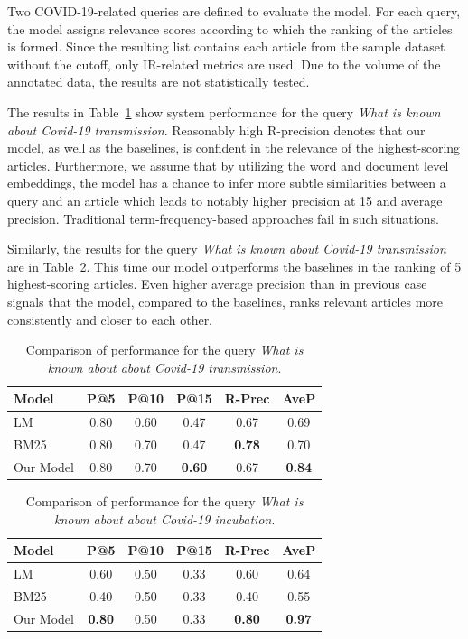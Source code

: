 \documentclass[10pt, a4paper]{article}
\begin{document}
	Two COVID-19-related queries are defined to evaluate the model. For each query, the model assigns relevance scores according to which the ranking of the articles is formed. Since the resulting list contains each article from the sample dataset without the cutoff, only IR-related metrics are used. Due to the volume of the annotated data, the results are not statistically tested. 
	
	The results in Table~\ref{tab:query1} show system performance for the query \textit{What is known about Covid-19 transmission}. Reasonably high R-precision denotes that our model, as well as the baselines, is confident in the relevance of the highest-scoring articles. Furthermore, we assume that by utilizing the word and document level embeddings, the model has a chance to infer more subtle similarities between a query and an article which leads to notably higher precision at 15 and average precision. Traditional term-frequency-based approaches fail in such situations.
	
	Similarly, the results for the query \textit{What is known about Covid-19 transmission} are in Table~\ref{tab:query2}. This time our model outperforms the baselines in the ranking of 5 highest-scoring articles. Even higher average precision than in previous case signals that the model, compared to the baselines, ranks relevant articles more consistently and closer to each other.
	
	\begin{table}
		\caption{Comparison of performance for the query \textit{What is known about about Covid-19 transmission}.}
		\label{tab:query1}
		\begin{center}
			\begin{tabular}{lccccc}
				\toprule
				Model & P@5 & P@10 & P@15 & R-Prec & AveP \\
				\midrule
				LM & 0.80 & 0.60 & 0.47 & 0.67 & 0.69  \\
				BM25 & 0.80 & 0.70 & 0.47 & \textbf{0.78} & 0.70 \\
				Our Model & 0.80 & 0.70 & \textbf{0.60} & 0.67 & \textbf{0.84} \\
				\bottomrule
			\end{tabular}
		\end{center}
	\end{table}
	
	\begin{table}
		\caption{Comparison of performance for the query \textit{What is known about about Covid-19 incubation}.}
		\label{tab:query2}
		\begin{center}
			\begin{tabular}{lccccc}
				\toprule
				Model & P@5 & P@10 & P@15 & R-Prec & AveP \\
				\midrule
				LM & 0.60 & 0.50 & 0.33 & 0.60 & 0.64 \\
				BM25 & 0.40 & 0.50 & 0.33 & 0.40 & 0.55 \\
				Our Model & \textbf{0.80} & 0.50 & 0.33 & \textbf{0.80} & \textbf{0.97} \\
				\bottomrule
			\end{tabular}
		\end{center}
	\end{table}
\end{document}
